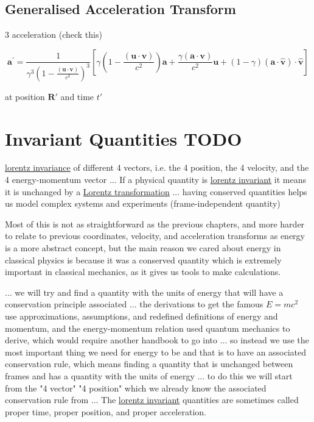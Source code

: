 \section{Generalised Acceleration Transform}

3 acceleration (check this)

\begin{equation}
	\mathbf{a^{'}} = \frac{1}{\gamma ^3 \left(1-\frac{(\mathbf{u}\cdot \mathbf{v})}{c^2}\right)^3}\left[ \gamma  \left(1-\frac{(\mathbf{u}\cdot\mathbf{v})}{c^2}\right)\mathbf{a}+\frac{\gamma (\mathbf{a}\cdot\mathbf{v})}{c^2}\mathbf{u} + (1-\gamma ) (\mathbf{a}\cdot\hat{\mathbf{v}}) \cdot\hat{\mathbf{v}}\right]
\end{equation}

at position $\mathbf{R'}$ and time $t'$

\chapter{Invariant Quantities TODO}

\hyperlink{def-lorentz-invariant}{lorentz invariance} of different 4 vectors, i.e. the 4 position, the 4 velocity, and the 4 energy-momentum vector
... If a physical quantity is \hyperlink{def-lorentz-invariant}{lorentz invariant} it means it is unchanged by a \hyperlink{def-lorentz-transform}{Lorentz transformation}
... having conserved quantities helps us model complex systems and experiments (frame-independent quantity)

Most of this is not as straightforward as the previous chapters, and more harder to relate to previous coordinates, velocity, and acceleration transforms as energy is a more abstract concept, but the main reason we cared about energy in classical physics is because it was a conserved quantity which is extremely important in classical mechanics, as it gives us tools to make calculations.

... we will try and find a quantity with the units of energy that will have a conservation principle associated
... the derivations to get the famous $E=mc^2$ use approximations, assumptions, and redefined definitions of energy and momentum, and the energy-momentum relation used quantum mechanics to derive, which would require another handbook to go into
... so instead we use the most important thing we need for energy to be and that is to have an associated conservation rule, which means finding a quantity that is unchanged between frames and has a quantity with the units of energy
... to do this we will start from the "4 vector" "4 position" which we already know the associated conservation rule from
... The \hyperlink{def-lorentz-invariant}{lorentz invariant} quantities are sometimes called proper time, proper position, and proper acceleration.

